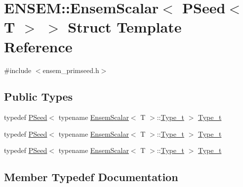 \hypertarget{structENSEM_1_1EnsemScalar_3_01PSeed_3_01T_01_4_01_4}{}\section{E\+N\+S\+EM\+:\+:Ensem\+Scalar$<$ P\+Seed$<$ T $>$ $>$ Struct Template Reference}
\label{structENSEM_1_1EnsemScalar_3_01PSeed_3_01T_01_4_01_4}


{\ttfamily \#include $<$ensem\+\_\+primseed.\+h$>$}

\subsection*{Public Types}
\begin{DoxyCompactItemize}
\item 
typedef \mbox{\hyperlink{classENSEM_1_1PSeed}{P\+Seed}}$<$ typename \mbox{\hyperlink{structENSEM_1_1EnsemScalar}{Ensem\+Scalar}}$<$ T $>$\+::\mbox{\hyperlink{structENSEM_1_1EnsemScalar_3_01PSeed_3_01T_01_4_01_4_abb7f97324ea0068fcbf50343784cd95c}{Type\+\_\+t}} $>$ \mbox{\hyperlink{structENSEM_1_1EnsemScalar_3_01PSeed_3_01T_01_4_01_4_abb7f97324ea0068fcbf50343784cd95c}{Type\+\_\+t}}
\item 
typedef \mbox{\hyperlink{classENSEM_1_1PSeed}{P\+Seed}}$<$ typename \mbox{\hyperlink{structENSEM_1_1EnsemScalar}{Ensem\+Scalar}}$<$ T $>$\+::\mbox{\hyperlink{structENSEM_1_1EnsemScalar_3_01PSeed_3_01T_01_4_01_4_abb7f97324ea0068fcbf50343784cd95c}{Type\+\_\+t}} $>$ \mbox{\hyperlink{structENSEM_1_1EnsemScalar_3_01PSeed_3_01T_01_4_01_4_abb7f97324ea0068fcbf50343784cd95c}{Type\+\_\+t}}
\item 
typedef \mbox{\hyperlink{classENSEM_1_1PSeed}{P\+Seed}}$<$ typename \mbox{\hyperlink{structENSEM_1_1EnsemScalar}{Ensem\+Scalar}}$<$ T $>$\+::\mbox{\hyperlink{structENSEM_1_1EnsemScalar_3_01PSeed_3_01T_01_4_01_4_abb7f97324ea0068fcbf50343784cd95c}{Type\+\_\+t}} $>$ \mbox{\hyperlink{structENSEM_1_1EnsemScalar_3_01PSeed_3_01T_01_4_01_4_abb7f97324ea0068fcbf50343784cd95c}{Type\+\_\+t}}
\end{DoxyCompactItemize}


\subsection{Member Typedef Documentation}
\mbox{\label{structENSEM_1_1EnsemScalar_3_01PSeed_3_01T_01_4_01_4_abb7f97324ea0068fcbf50343784cd95c}} 
